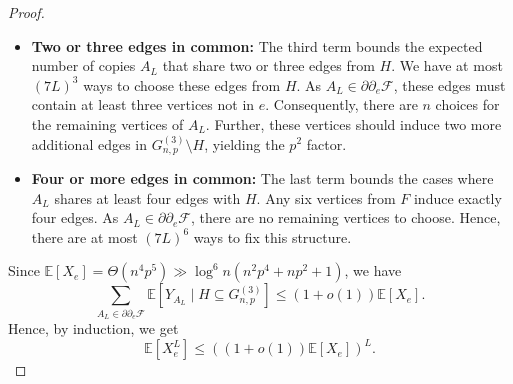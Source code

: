\documentclass[11pt,a4paper,oneside,reqno]{amsart}
\newcommand{\Gnp}{G_{n, p}^{(3)}}
\newcommand{\cF}{\mathcal{F}}
\newcommand{\1}{\mathbbm{1}} %
\renewcommand{\le}{\leqslant}
\begin{document}
\begin{proof}
\begin{itemize}
        \item \textbf{Two or three edges in common:} The third term bounds the expected number of copies $A_L$ that share two or three edges from $H$. We have at most $(7L)^3$ ways to choose these edges from $H$. As $A_L \in \partial \partial_e\cF$, these edges must contain at least three vertices not in $e$. Consequently, there are $n$ choices for the remaining vertices of $A_L$. Further, these vertices should induce two more additional edges in $\Gnp \setminus H$, yielding the $p^2$ factor.
        \item \textbf{Four or more edges in common:} The last term bounds the cases where $A_L$ shares at least four edges with $H$. Any six vertices from $F$ induce exactly four edges. As $A_L \in \partial \partial_e\cF$, there are no remaining vertices to choose. Hence, there are at most $(7L)^6$ ways to fix this structure.
    \end{itemize}

    Since $\mathbb{E}\left[X_e\right] = \Theta(n^4 p^5) \gg \log^6 n (n^2 p^4 + np^2 + 1)$, we have
    \[
        \sum_{A_L \in \partial \partial_e \cF} \mathbb{E}\left[Y_{A_L} \mid H \subseteq \Gnp\right] \le (1 + o(1)) \mathbb{E}\left[X_e\right].
    \]
    Hence, by induction, we get
    \[
        \mathbb{E}\left[X_e^L\right] \le \left((1+o(1)) \mathbb{E}\left[X_e\right]\right)^L.
    \]


\end{proof}
\end{document}
